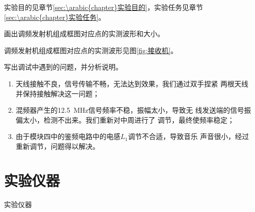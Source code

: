 \documentclass[../main]{subfiles}
\begin{document}
\begin{Answer}

	实验目的见章节\ref{sec:\arabic{chapter}实验目的}，实验任务见章节
	\ref{sec:\arabic{chapter}实验任务}。

\end{Answer}

\begin{Exercise}

	画出调频发射机组成框图对应点的实测波形和大小。

\end{Exercise}

\begin{Answer}

	调频发射机组成框图对应点的实测波形见图\ref{fig:接收机}。

\end{Answer}

\begin{Exercise}

	写出调试中遇到的问题，并分析说明。

\end{Exercise}

\begin{Answer}

	\begin{enumerate}

		\item 天线接触不良，信号传输不畅，无法达到效果，我们通过双手捏紧
			两根天线并保持接触解决这一问题；

		\item 混频器产生的\SI{12.5}{\MHz}信号频率不稳，振幅太小，导致无
			线发送端的信号振偏太小，检测不出来。我们重新对中周进行了
			调节，最终使频率稳定；

		\item 由于模块四中的鉴频电路中的电感$ L_1 $调节不合适，导致音乐
			声音很小，经过重新调节，问题得以解决。

	\end{enumerate}

\end{Answer}

\section{实验仪器}%
\label{sec:\arabic{chapter}实验仪器}

\begin{table}[htbp]
	\centering
	\caption{实验仪器}
	\label{tab:\arabic{chapter}实验仪器}
\end{table}
\end{document}
